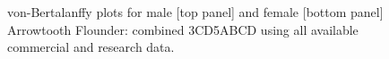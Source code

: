 \begin{figure}[htp]
\captionsetup[subfigure]{labelformat=empty}
\begin{center}
\newline
{}
\end{center}
\caption{von-Bertalanffy plots for male [top panel] and female [bottom panel] Arrowtooth Flounder: combined 3CD5ABCD using all available commercial and research data.}
\label{fig:vonb}
\end{figure}

